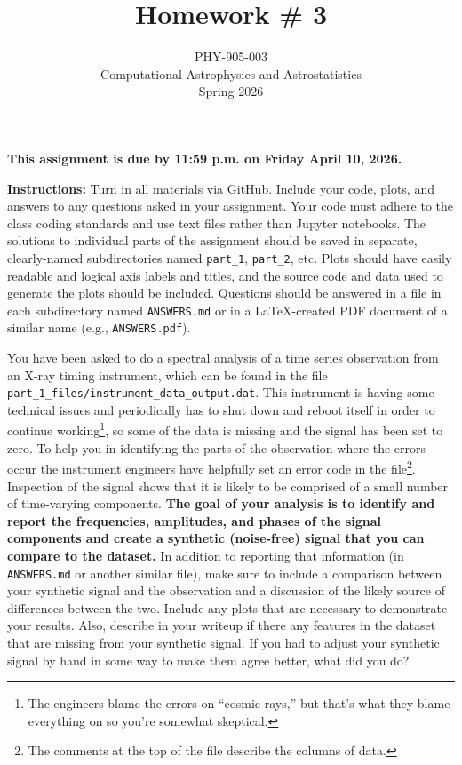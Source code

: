 \documentclass[10pt]{article}
\title{Homework \# 3}
\author{PHY-905-003\\Computational Astrophysics and
  Astrostatistics\\Spring 2026}
\date{} %
\begin{document}
 
\maketitle


\vspace{-5mm}

\centerline{ {\large
\textbf{This assignment is due by 11:59 p.m. on Friday April 10,
  2026.} } }

\vspace{5mm}

\noindent
\textbf{Instructions:}
Turn in all materials via GitHub.  Include your code, plots, and
answers to any questions asked in your assignment.  Your code must
adhere to the class coding standards and use text files rather than
Jupyter notebooks.  The solutions to individual parts of the
assignment should be saved in separate, clearly-named subdirectories
named \texttt{part\_1}, \texttt{part\_2}, etc.  Plots should have
easily readable and logical axis labels and titles, and the source
code and data used to generate the plots should be included.
Questions should be answered in a file in each subdirectory named
\texttt{ANSWERS.md} or in a \LaTeX-created PDF document of a similar
name (e.g., \texttt{ANSWERS.pdf}).


\vspace{5mm}

  You have been asked to do a
spectral analysis of a time series observation from an X-ray timing
instrument, which can be found in the file
\texttt{part\_1\_files/instrument\_data\_output.dat}.  This instrument
is having some technical issues and periodically has to shut down and
reboot itself in order to continue working\footnote{The engineers
blame the errors on ``cosmic rays,'' but that's what they blame
everything on so you're somewhat skeptical.}, so some of the data is
missing and the signal has been set to zero.  To help you in
identifying the parts of the observation where the errors occur the
instrument engineers have helpfully set an error code in the
file\footnote{The comments at the top of the file describe the columns
of data.}.  Inspection of the signal shows that it is likely to be
comprised of a small number of time-varying components.  \textbf{The
goal of your analysis is to identify and report the frequencies,
amplitudes, and phases of the signal components and create a synthetic
(noise-free) signal that you can compare to the dataset.}  In addition
to reporting that information (in \texttt{ANSWERS.md} or another
similar file), make sure to include a comparison between your
synthetic signal and the observation and a discussion of the likely
source of differences between the two.  Include any plots that are
necessary to demonstrate your results.  Also, describe in your writeup
if there any features in the dataset that are missing from your
synthetic signal.  If you had to adjust your synthetic signal by hand
in some way to make them agree better, what did you do?
\end{document}
